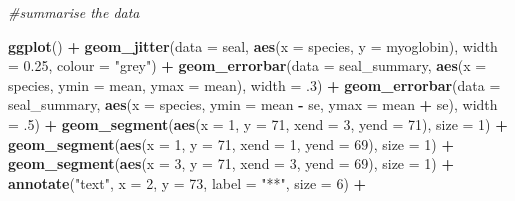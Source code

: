 \documentclass[
]{book}
\newenvironment{Shaded}{\begin{snugshade}}{\end{snugshade}}
\newcommand{\CommentTok}[1]{\textcolor[rgb]{0.56,0.35,0.01}{\textit{#1}}}
\newcommand{\DataTypeTok}[1]{\textcolor[rgb]{0.13,0.29,0.53}{#1}}
\newcommand{\DecValTok}[1]{\textcolor[rgb]{0.00,0.00,0.81}{#1}}
\newcommand{\FloatTok}[1]{\textcolor[rgb]{0.00,0.00,0.81}{#1}}
\newcommand{\KeywordTok}[1]{\textcolor[rgb]{0.13,0.29,0.53}{\textbf{#1}}}
\newcommand{\NormalTok}[1]{#1}
\newcommand{\OperatorTok}[1]{\textcolor[rgb]{0.81,0.36,0.00}{\textbf{#1}}}
\newcommand{\StringTok}[1]{\textcolor[rgb]{0.31,0.60,0.02}{#1}}
\begin{document}
\begin{Shaded}
\begin{Highlighting}[]
\CommentTok{#summarise the data }

\KeywordTok{ggplot}\NormalTok{() }\OperatorTok{+}
\StringTok{  }\KeywordTok{geom_jitter}\NormalTok{(}\DataTypeTok{data =}\NormalTok{ seal, }
              \KeywordTok{aes}\NormalTok{(}\DataTypeTok{x =}\NormalTok{ species, }\DataTypeTok{y =}\NormalTok{ myoglobin), }
              \DataTypeTok{width =} \FloatTok{0.25}\NormalTok{, }\DataTypeTok{colour =} \StringTok{"grey"}\NormalTok{) }\OperatorTok{+}
\StringTok{  }\KeywordTok{geom_errorbar}\NormalTok{(}\DataTypeTok{data =}\NormalTok{ seal_summary,}
                \KeywordTok{aes}\NormalTok{(}\DataTypeTok{x =}\NormalTok{ species,}
                    \DataTypeTok{ymin =}\NormalTok{ mean,}
                    \DataTypeTok{ymax =}\NormalTok{ mean),}
                \DataTypeTok{width =} \FloatTok{.3}\NormalTok{) }\OperatorTok{+}
\StringTok{  }\KeywordTok{geom_errorbar}\NormalTok{(}\DataTypeTok{data =}\NormalTok{ seal_summary,}
                \KeywordTok{aes}\NormalTok{(}\DataTypeTok{x =}\NormalTok{ species,}
                    \DataTypeTok{ymin =}\NormalTok{ mean }\OperatorTok{-}\StringTok{ }\NormalTok{se,}
                    \DataTypeTok{ymax =}\NormalTok{ mean }\OperatorTok{+}\StringTok{ }\NormalTok{se),}
                \DataTypeTok{width =} \FloatTok{.5}\NormalTok{) }\OperatorTok{+}
\StringTok{  }\KeywordTok{geom_segment}\NormalTok{(}\KeywordTok{aes}\NormalTok{(}\DataTypeTok{x =} \DecValTok{1}\NormalTok{, }\DataTypeTok{y =} \DecValTok{71}\NormalTok{, }\DataTypeTok{xend =} \DecValTok{3}\NormalTok{, }\DataTypeTok{yend =} \DecValTok{71}\NormalTok{),}
               \DataTypeTok{size =} \DecValTok{1}\NormalTok{) }\OperatorTok{+}
\StringTok{  }\KeywordTok{geom_segment}\NormalTok{(}\KeywordTok{aes}\NormalTok{(}\DataTypeTok{x =} \DecValTok{1}\NormalTok{, }\DataTypeTok{y =} \DecValTok{71}\NormalTok{, }\DataTypeTok{xend =} \DecValTok{1}\NormalTok{, }\DataTypeTok{yend =} \DecValTok{69}\NormalTok{),}
               \DataTypeTok{size =} \DecValTok{1}\NormalTok{) }\OperatorTok{+}
\StringTok{  }\KeywordTok{geom_segment}\NormalTok{(}\KeywordTok{aes}\NormalTok{(}\DataTypeTok{x =} \DecValTok{3}\NormalTok{, }\DataTypeTok{y =} \DecValTok{71}\NormalTok{, }\DataTypeTok{xend =} \DecValTok{3}\NormalTok{, }\DataTypeTok{yend =} \DecValTok{69}\NormalTok{),}
               \DataTypeTok{size =} \DecValTok{1}\NormalTok{) }\OperatorTok{+}
\StringTok{  }\KeywordTok{annotate}\NormalTok{(}\StringTok{"text"}\NormalTok{, }\DataTypeTok{x =} \DecValTok{2}\NormalTok{, }\DataTypeTok{y =} \DecValTok{73}\NormalTok{,  }\DataTypeTok{label =} \StringTok{"**"}\NormalTok{, }\DataTypeTok{size =} \DecValTok{6}\NormalTok{) }\OperatorTok{+}

\end{Highlighting}
\end{Shaded}
\end{document}
